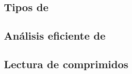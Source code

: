 




\subsection{Tipos de \transacciones}
\label{sec:clasificacion:transacciones-tipo-ii:tipos-de-transacciones}





\subsection{Análisis eficiente de \Registros}
\label{sec:clasificacion:transacciones-tipo-ii:analisis-eficiente}





\subsection{Lectura de \datasets comprimidos}
\label{sec:clasificacion:transacciones-tipo-ii:lectura}

